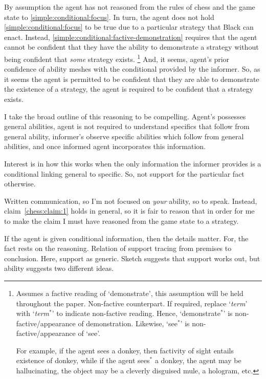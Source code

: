 \documentclass[10pt]{article}
\newcommand{\nf}[1]{#1\ensuremath{^{{*}}}}
\newcommand{\hozlinedash}[0]{%
  \noindent\hdashrule[0.5ex][c]{\textwidth}{.1pt}{2.5pt}
}
\begin{document}
By assumption the agent has not reasoned from the rules of chess and the game state to \ref{simple:conditional:focus}.
In turn, the agent does not hold \ref{simple:conditional:focus} to be true due to a particular strategy that Black can enact.
Instead, \ref{simple:conditional:factive-demonstration} requires that the agent cannot be confident that they have the ability to demonstrate a strategy without being confident that \emph{some} strategy exists.\nolinebreak
\footnote{
  Assumes a factive reading of `demonstrate', this assumption will be held throughout the paper.
  Non-factive counterpart.
  If required, replace `\emph{term}' with `\nf{\emph{term}}' to indicate non-factive reading.
  Hence, `\nf{demonstrate}' is non-factive/appearance of demonstration.
  Likewise, `\nf{see}' is non-factive/appearance of `see'.

  For example, if the agent sees a donkey, then factivity of sight entails existence of donkey, while if the agent \nf{sees} a donkey, the agent may be hallucinating, the object may be a cleverly disguised mule, a hologram, etc.
}
And, it seems, agent's prior confidence of ability meshes with the conditional provided by the informer.
So, as it seems the agent is permitted to be confident that they are able to demonstrate the existence of a strategy, the agent is required to be confident that a strategy exists.

I take the broad outline of this reasoning to be compelling.
Agent's possesses general abilities, agent is not required to understand specifics that follow from general ability, informer's observe specific abilities which follow from general abilities, and once informed agent incorporates this information.

Interest is in how this works when the only information the informer provides is a conditional linking general to specific.
So, not support for the particular fact otherwise.

\begin{note}
Written communication, so I'm not focused on \emph{your} ability, so to speak.
Instead, claim~\ref{chess:claim:1} holds in general, so it is fair to reason that in order for me to make the claim I must have reasoned from the game state to a strategy.
\end{note}

\hozlinedash

\begin{note}
  If the agent is given conditional information, then the details matter.
  For, the fact rests on the reasoning.
  Relation of support tracing from premises to conclusion.
  Here, support as generic.
  Sketch suggests that support works out, but ability suggests two different ideas.
\end{note}
\end{document}
